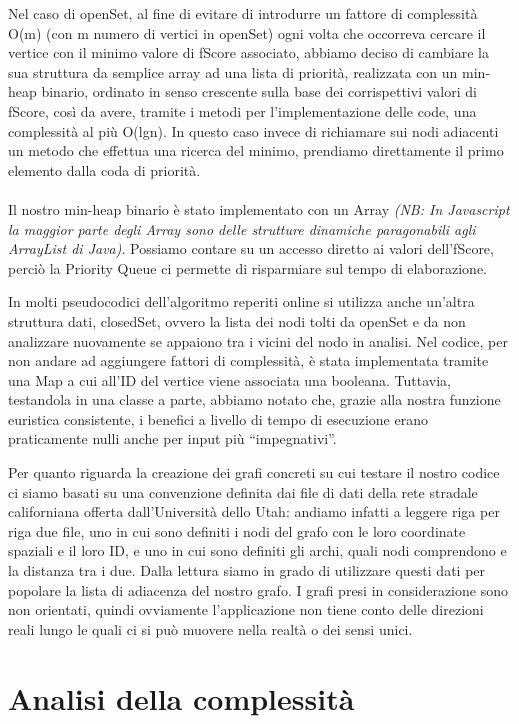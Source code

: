 \documentclass[12pt,a4paper]{report}
\begin{document}
Nel caso di openSet, al fine di evitare di introdurre un fattore di complessità O(m) (con m numero di vertici in openSet) ogni volta che occorreva cercare il vertice con il minimo valore di fScore associato, abbiamo deciso di cambiare la sua struttura da semplice array ad una lista di priorità, realizzata con un min-heap binario, ordinato in senso crescente sulla base dei corrispettivi valori di fScore, così da avere, tramite i metodi per l'implementazione delle code, una complessità al più O(lgn). 
In questo caso invece di richiamare sui nodi adiacenti un metodo che effettua una ricerca del minimo, prendiamo direttamente il primo elemento dalla coda di priorità.\\ \\ Il nostro min-heap binario è stato implementato con un Array \emph{(NB: In Javascript la maggior parte degli Array sono delle strutture dinamiche paragonabili agli ArrayList di Java)}. Possiamo contare su un accesso diretto ai valori dell'fScore, perciò la Priority Queue ci permette di risparmiare sul tempo di elaborazione.


In molti pseudocodici dell'algoritmo reperiti online si utilizza anche un'altra struttura dati, closedSet, ovvero la lista dei nodi tolti da openSet e da non analizzare nuovamente se appaiono tra i vicini del nodo in analisi. Nel codice, per non andare ad aggiungere fattori di complessità, è stata implementata tramite una Map a cui all'ID del vertice viene associata una booleana. Tuttavia, testandola in una classe a parte, abbiamo notato che, grazie alla nostra funzione euristica consistente, i benefici a livello di tempo di esecuzione erano praticamente nulli anche per input più “impegnativi”. 


Per quanto riguarda la creazione dei grafi concreti su cui testare il nostro codice ci siamo basati su una convenzione definita dai file di dati della rete stradale californiana offerta dall'Università dello Utah: andiamo infatti a leggere riga per riga due file, uno in cui sono definiti i nodi del grafo con le loro coordinate spaziali e il loro ID, e uno in cui sono definiti gli archi, quali nodi comprendono e la distanza tra i due. Dalla lettura siamo in grado di utilizzare questi dati per popolare la lista di adiacenza del nostro grafo. I grafi presi in considerazione sono non orientati, quindi ovviamente l'applicazione non tiene conto delle direzioni reali lungo le quali ci si può muovere nella realtà o dei sensi unici.

\chapter{Analisi della complessità}
\end{document}
